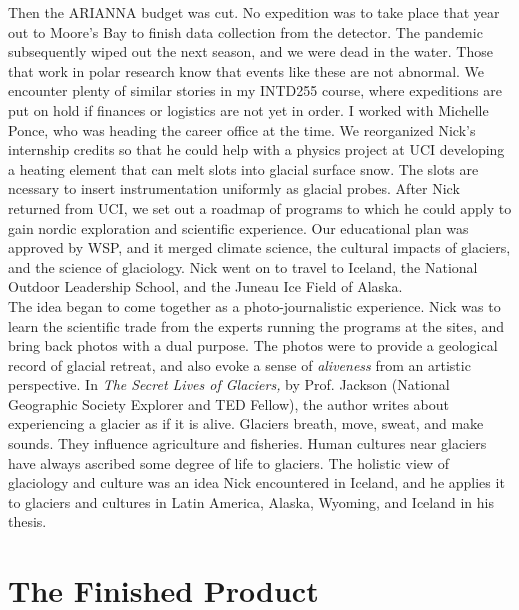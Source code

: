 \documentclass[../../../main.tex]{subfiles}
\begin{document}
Then the ARIANNA budget was cut.  No expedition was to take place that year out to Moore's Bay to finish data collection from the detector.  The pandemic subsequently wiped out the next season, and we were dead in the water.  Those that work in polar research know that events like these are not abnormal.  We encounter plenty of similar stories in my INTD255 course, where expeditions are put on hold if finances or logistics are not yet in order.  I worked with Michelle Ponce, who was heading the career office at the time.  We reorganized Nick's internship credits so that he could help with a physics project at UCI developing a heating element that can melt slots into glacial surface snow.  The slots are ncessary to insert instrumentation uniformly as glacial probes.  After Nick returned from UCI, we set out a roadmap of programs to which he could apply to gain nordic exploration and scientific experience.  Our educational plan was approved by WSP, and it merged climate science, the cultural impacts of glaciers, and the science of glaciology.  Nick went on to travel to Iceland, the National Outdoor Leadership School, and the Juneau Ice Field of Alaska.
\\
\vspace{0.25cm}
The idea began to come together as a photo-journalistic experience.  Nick was to learn the scientific trade from the experts running the programs at the sites, and bring back photos with a dual purpose.  The photos were to provide a geological record of glacial retreat, and also evoke a sense of \textit{aliveness} from an artistic perspective.  In \textit{The Secret Lives of Glaciers,} by Prof. Jackson (National Geographic Society Explorer and TED Fellow), the author writes about experiencing a glacier as if it is alive.  Glaciers breath, move, sweat, and make sounds.  They influence agriculture and fisheries.  Human cultures near glaciers have always ascribed some degree of life to glaciers.  The holistic view of glaciology and culture was an idea Nick encountered in Iceland, and he applies it to glaciers and cultures in Latin America, Alaska, Wyoming, and Iceland in his thesis.

\section{The Finished Product}
\end{document}
